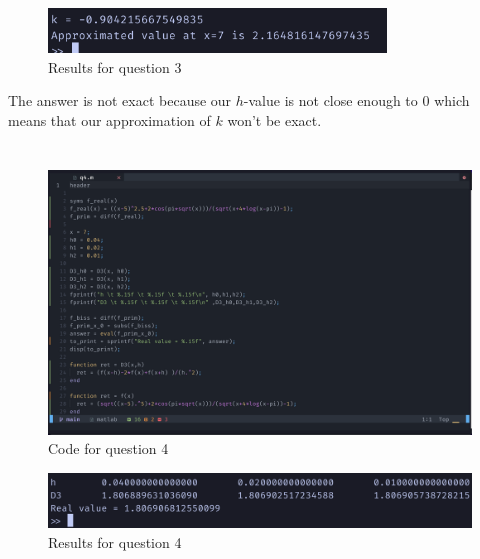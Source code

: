 \documentclass{article}
\begin{document}
\begin{figure}[H]
	\centering
	\includegraphics[width=0.8\textwidth]{imgs/q3_results.png}
	\caption{Results for question 3}
	\label{fig:q3_result}
\end{figure}

The answer is not exact because our $h$-value is not close enough to $0$ which means that our approximation of $k$ won't be exact.


\newpage
\section{}
\begin{figure}[H]
	\centering
	\includegraphics[width=\textwidth]{imgs/q4_code.png}
	\caption{Code for question 4}
	\label{fig:q4_code}
\end{figure}

\begin{figure}[H]
	\centering
	\includegraphics[width=\textwidth]{imgs/q4_results.png}
	\caption{Results for question 4}
	\label{fig:q4_result}
\end{figure}

\newpage
\section{}
\end{document}
